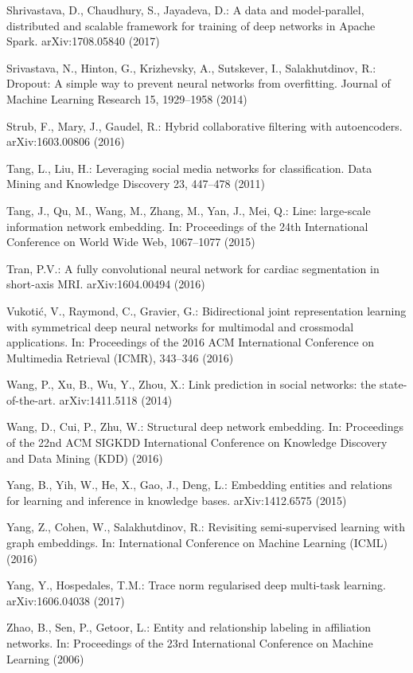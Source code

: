 \documentclass[letterpaper, conference]{IEEEtran}  %
\begin{document}
\begin{thebibliography}{99}
Shrivastava, D., Chaudhury, S., Jayadeva, D.:
A data and model-parallel, distributed and scalable framework for training of deep networks in Apache Spark.
arXiv:1708.05840 (2017)

Srivastava, N., Hinton, G., Krizhevsky, A., Sutskever, I., Salakhutdinov, R.:
Dropout: A simple way to prevent neural networks from overfitting.
Journal of Machine Learning Research 15, 1929--1958 (2014)

Strub, F., Mary, J., Gaudel, R.:
Hybrid collaborative filtering with autoencoders.
arXiv:1603.00806 (2016)

Tang, L., Liu, H.:
Leveraging social media networks for classification.
Data Mining and Knowledge Discovery 23, 447--478 (2011)

Tang, J., Qu, M., Wang, M., Zhang, M., Yan, J., Mei, Q.:
Line: large-scale information network embedding.
In: Proceedings of the 24th International Conference on World Wide Web, 1067--1077 (2015)

Tran, P.V.:
A fully convolutional neural network for cardiac segmentation in short-axis MRI.
arXiv:1604.00494 (2016)

Vukoti{\'c}, V., Raymond, C., Gravier, G.:
Bidirectional joint representation learning with symmetrical deep neural networks for multimodal and crossmodal applications.
In: Proceedings of the 2016 ACM International Conference on Multimedia Retrieval (ICMR), 343--346 (2016)

Wang, P., Xu, B., Wu, Y., Zhou, X.:
Link prediction in social networks: the state-of-the-art.
arXiv:1411.5118 (2014)

Wang, D., Cui, P., Zhu, W.:
Structural deep network embedding.
In: Proceedings of the 22nd ACM SIGKDD International Conference on Knowledge Discovery and Data Mining (KDD) (2016)

Yang, B., Yih, W., He, X., Gao, J., Deng, L.:
Embedding entities and relations for learning and inference in knowledge bases.
arXiv:1412.6575 (2015)

Yang, Z., Cohen, W., Salakhutdinov, R.:
Revisiting semi-supervised learning with graph embeddings.
In: International Conference on Machine Learning (ICML) (2016)

Yang, Y., Hospedales, T.M.:
Trace norm regularised deep multi-task learning.
arXiv:1606.04038 (2017)

Zhao, B., Sen, P., Getoor, L.:
Entity and relationship labeling in affiliation networks.
In: Proceedings of the 23rd International Conference on Machine Learning (2006)

\end{thebibliography}
\end{document}
